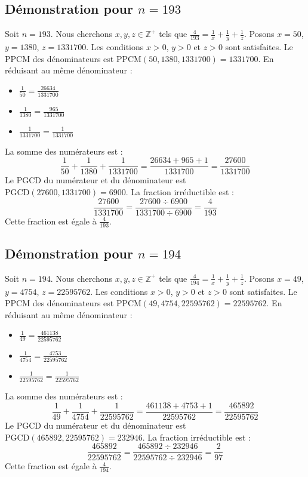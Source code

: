 \documentclass[11pt,a4paper]{article}
\begin{document}
\subsection{Démonstration pour $n = 193$}
Soit $n = 193$. Nous cherchons $x, y, z \in \mathbb{Z}^{+}$ tels que $\frac{4}{193} = \frac{1}{x} + \frac{1}{y} + \frac{1}{z}$.
Posons $x = 50$, $y = 1380$, $z = 1331700$.
Les conditions $x > 0$, $y > 0$ et $z > 0$ sont satisfaites.
Le PPCM des dénominateurs est $\text{PPCM}(50, 1380, 1331700) = 1331700$.
En réduisant au même dénominateur :
\begin{itemize}
    \item $\frac{1}{50} = \frac{26634}{1331700}$
    \item $\frac{1}{1380} = \frac{965}{1331700}$
    \item $\frac{1}{1331700} = \frac{1}{1331700}$
\end{itemize}
La somme des numérateurs est :
$$ \frac{1}{50} + \frac{1}{1380} + \frac{1}{1331700} = \frac{26634 + 965 + 1}{1331700} = \frac{27600}{1331700} $$
Le PGCD du numérateur et du dénominateur est $\text{PGCD}(27600, 1331700) = 6900$.
La fraction irréductible est :
$$ \frac{27600}{1331700} = \frac{27600 \div 6900}{1331700 \div 6900} = \frac{4}{193} $$
Cette fraction est égale à $\frac{4}{193}$.

\subsection{Démonstration pour $n = 194$}
Soit $n = 194$. Nous cherchons $x, y, z \in \mathbb{Z}^{+}$ tels que $\frac{4}{194} = \frac{1}{x} + \frac{1}{y} + \frac{1}{z}$.
Posons $x = 49$, $y = 4754$, $z = 22595762$.
Les conditions $x > 0$, $y > 0$ et $z > 0$ sont satisfaites.
Le PPCM des dénominateurs est $\text{PPCM}(49, 4754, 22595762) = 22595762$.
En réduisant au même dénominateur :
\begin{itemize}
    \item $\frac{1}{49} = \frac{461138}{22595762}$
    \item $\frac{1}{4754} = \frac{4753}{22595762}$
    \item $\frac{1}{22595762} = \frac{1}{22595762}$
\end{itemize}
La somme des numérateurs est :
$$ \frac{1}{49} + \frac{1}{4754} + \frac{1}{22595762} = \frac{461138 + 4753 + 1}{22595762} = \frac{465892}{22595762} $$
Le PGCD du numérateur et du dénominateur est $\text{PGCD}(465892, 22595762) = 232946$.
La fraction irréductible est :
$$ \frac{465892}{22595762} = \frac{465892 \div 232946}{22595762 \div 232946} = \frac{2}{97} $$
Cette fraction est égale à $\frac{4}{194}$.
\end{document}
